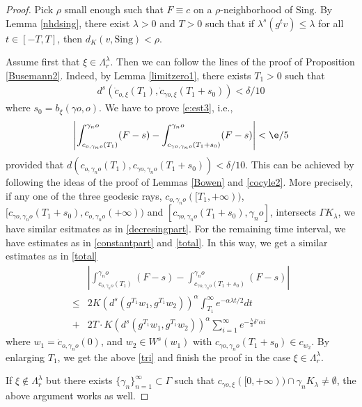 \documentclass[11pt]{amsart}
\theoremstyle{definition}
\def\a{\alpha}
\def\c{\gamma}   \def\C{\Gamma}
\def\d{\delta}   %
\def\l{\lambda}   \def\L{\Lambda}
\begin{document}
\begin{proof}
Pick $\rho$ small enough such that $F\equiv c$ on a $\rho$-neighborhood of $\text{Sing}$. By Lemma \ref{nhdsing}, there exist $\l>0$ and $T>0$ such that if $\l^s(g^tv)\le \l$ for all $t\in [-T,T]$, then $d_K(v, \text{Sing})<\rho$. 

Assume first that $\xi\in \L_r^\l$. Then we can follow the lines of the proof of Proposition \ref{Busemann2}. Indeed, by Lemma \ref{limitzero1}, there exists $T_1>0$ such that 
\begin{equation}\label{smalldis}
\begin{aligned}
d^s(\dot c_{o,\xi}(T_1), \dot c_{\c o,\xi}(T_1+s_0))<\d/10
\end{aligned}
\end{equation}
where $s_0=b_\xi(\c o, o).$ We have to prove \eqref{e:est3}, i.e.,
\begin{equation}\label{tri}
\begin{aligned}
\left|\int_{c_{o,\c_n o}(T_1)}^{\c_n o}(F-s)-\int_{c_{\c o,\c_n o}(T_1+s_0)}^{\c_n o}(F-s)\right|<\e/5
\end{aligned}
\end{equation}
provided that $d(c_{o,\c_n o}(T_1),c_{\c o,\c_n o}(T_1+s_0))<\d/10$. This can be achieved by following the ideas of the proof of Lemmas \ref{Bowen} and \ref{cocyle2}. More precisely, if any one of the three geodesic rays, $c_{o,\c_n o}([T_1,+\infty))$, $[c_{\c o,\c_n o}(T_1+s_0), c_{o,\c_n o}(+\infty))$ and $[c_{\c o,\c_n o}(T_1+s_0), \c_n o]$, intersects $\C K_\l$, we have similar esitmates as in \eqref{decresingpart}. For the remaining time interval, we have estimates as in \eqref{constantpart} and \eqref{total}. In this way, we get a similar estimates as in \eqref{total}
\begin{equation*}
\begin{aligned}
&\left|\int_{c_{o,\c_n o}(T_1)}^{\c_n o}(F-s)-\int_{c_{\c o,\c_n o}(T_1+s_0)}^{\c_n o}(F-s)\right|\\
\le &2K(d^s(g^{T_1}w_1, g^{T_1}w_2))^\a\int_{T_1}^{\infty}e^{-\a\l t/2}dt\\
+&2T\cdot K(d^s(g^{T_1}w_1, g^{T_1}w_2))^\a\sum_{i=1}^\infty e^{-\frac{\l}{3}\d'\a i}
\end{aligned}
\end{equation*}
where $w_1=\dot c_{o,\c_n o}(0)$, and $w_2\in W^s(w_1)$ with $c_{\c o,\c_n o}(T_1+s_0)\in c_{w_2}$.
By enlarging $T_1$, we get the above \eqref{tri} and finish the proof in the case $\xi\in \L_r^\l$.

If $\xi\notin \L_r^\l$ but there exists $\{\c_n\}_{n=1}^\infty\subset \C$ such that $c_{\c o,\xi}([0,+\infty))\cap \c_n K_\l\neq \emptyset$, the above argument works as well.


\end{proof}
\end{document}
